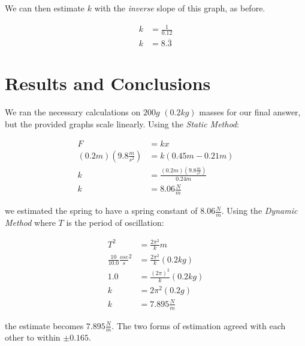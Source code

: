 \documentclass{article}
\begin{document}
We can then estimate $k$ with the \emph{inverse} slope of this graph, as before.

\begin{center}
\begin{align*}
k &= \frac{1}{0.12} \\
k &= 8.\overline{3}
\end{align*}
\end{center}

\section{Results and Conclusions}

We ran the necessary calculations on $200g$ $(0.2kg)$ masses for our final answer, but the provided graphs scale linearly. Using the \emph{Static Method}:

\begin{align*}
F &= kx \\
(0.2m)(9.8\frac{m}{s^2}) &= k(0.45m-0.21m) \\
k &= \frac{(0.2m)(9.8\frac{m}{s^2})}{0.24m} \\
k &= 8.06\frac{N}{m}
\end{align*}

we estimated the spring to have a spring constant of $8.06\frac{N}{m}$.
Using the \emph{Dynamic Method} where $T$ is the period of oscillation:

\begin{align*}
T^{2} &= \frac{2\pi^{2}}{k}m \\
\frac{10}{10.0}\frac{osc}{s}^2 &= \frac{2\pi^{2}}{k}(0.2kg) \\
1.0 &= \frac{(2\pi)^{2}}{k}(0.2kg) \\
k &= 2\pi^2(0.2g) \\
k &= 7.895\frac{N}{m}
\end{align*}

the estimate becomes $7.895\frac{N}{m}$. The two forms of estimation agreed with each other to within $\pm{0.165}$.
\end{document}
